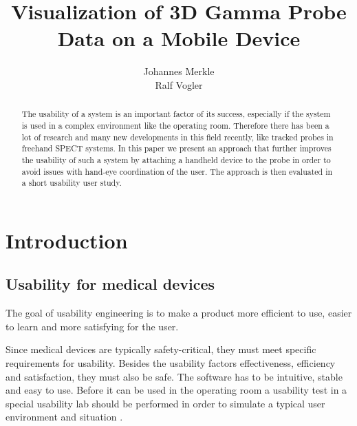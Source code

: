 \documentclass{scrartcl}
\title{Visualization of 3D Gamma Probe Data on a Mobile Device}
\author{Johannes Merkle \\ Ralf Vogler}
\newcommand{\red}[1]{{\color{red} #1}}
\begin{document}
\maketitle


\begin{abstract}
The usability of a system is an important factor of its success, especially if the system is used in a complex environment like the operating room. Therefore there has been a lot of research and many new developments in this field recently, like tracked probes in freehand SPECT systems. In this paper we present an approach that further improves the usability of such a system by attaching a handheld device to the probe in order to avoid issues with hand-eye coordination of the user. The approach is then evaluated in a short usability user study.
\end{abstract}



\section{Introduction}


\subsection{Usability for medical devices}
The goal of usability engineering is to make a product more efficient to use, easier to learn and more satisfying for the user.

Since medical devices are typically safety-critical, they must meet specific requirements for usability. Besides the usability factors effectiveness, efficiency and satisfaction, they must also be safe. The software has to be intuitive, stable and easy to use. Before it can be used in the operating room a usability test in a special usability lab should be performed in order to simulate a typical user environment and situation \cite{bigdelou}.
\end{document}
